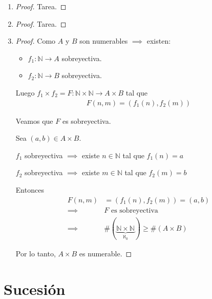 \begin{enumerate}
    \item \begin{proof} Tarea. \end{proof}
    \item \begin{proof} Tarea. \end{proof}
    \item \begin{proof} \phantom{.}

            Como $A$ y $B$ son numerables $\implies$ existen:
            \begin{itemize}
                \item $f_1: \mathbb{N} \to A$ sobreyectiva.
                \item $f_2: \mathbb{N} \to B$ sobreyectiva.
            \end{itemize}

            Luego 
            $f_1 \times f_2 = F: \mathbb{N} \times \mathbb{N} \to A \times B$
            tal que
            \begin{gather*}
                F(n, m) = \left(f_1(n), f_2(m)\right)
            \end{gather*}

            \medskip

            Veamos que $F$ es sobreyectiva.

            Sea $(a,b) \in A \times B$.

            $f_1$ sobreyectiva $\implies$ existe $n \in \mathbb{N}$
            tal que $f_1(n) = a$

            $f_2$ sobreyectiva $\implies$ existe $m \in \mathbb{N}$
            tal que $f_2(m) = b$

            Entonces
            \begin{align*}
                F(n, m) &= \left(f_1(n), f_2(m)\right) = (a,b) \\
                \implies& F \text{ es sobreyectiva} \\
                \implies& \# (
                \underbrace{\mathbb{N} \times \mathbb{N}}_{\aleph_0}
                ) 
                \geq \# (A \times B)
            \end{align*}

            Por lo tanto, $A \times B$ es numerable.
    \end{proof}
\end{enumerate}

\section{Sucesión}

